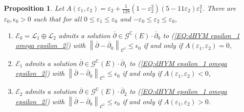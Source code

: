 \documentclass{article}
\newtheorem{proposition}[theorem]{Proposition}
\theoremstyle{remark}
\theoremstyle{definition}
\newcommand{\C}{\mathbb{C}}
\newcommand{\norme}[1]{\left\| #1 \right\|}
\newcommand{\E}{\mathcal{E}}
\newcommand{\G}{\mathcal{G}}
\newcommand{\mC}{\mathcal{C}}
\newcommand{\mL}{\mathcal{L}}
\newcommand{\dbar}{\overline{\partial}}
\renewcommand{\leq}{\leqslant}
\begin{document}
\begin{proposition}
    Let $A(\varepsilon_1,\varepsilon_2) = \varepsilon_2 + \frac{1}{128}(1 - \varepsilon_2^2)(5 - 11\varepsilon_2)\varepsilon_1^2$. There are $\varepsilon_0,\epsilon_0 > 0$ such that for all $0 \leq \varepsilon_1 \leq \varepsilon_0$ and $-\varepsilon_0 \leq \varepsilon_2 \leq \varepsilon_0$,
    \begin{enumerate}
        \item $\E_0 = \mL_1 \oplus \mL_2$ admits a solution $\dbar \in \G^\C(E) \cdot \dbar_0$ to (\ref{EQ:dHYM epsilon_1 omega epsilon_2}) with $\norme{\dbar - \dbar_0}_{\mC^1} \leq \epsilon_0$ if and only if $A(\varepsilon_1,\varepsilon_2) = 0$,
        \item $\E_1$ admits a solution $\dbar \in \G^\C(E) \cdot \dbar_1$ to (\ref{EQ:dHYM epsilon_1 omega epsilon_2}) with $\norme{\dbar - \dbar_0}_{\mC^1} \leq \epsilon_0$ if and only if $A(\varepsilon_1,\varepsilon_2) < 0$,
        \item $\E_2$ admits a solution $\dbar \in \G^\C(E) \cdot \dbar_2$ to (\ref{EQ:dHYM epsilon_1 omega epsilon_2}) with $\norme{\dbar - \dbar_0}_{\mC^1} \leq \epsilon_0$ if and only if $A(\varepsilon_1,\varepsilon_2) > 0$.
    \end{enumerate}
\end{proposition}
\end{document}
